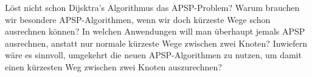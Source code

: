 \documentclass{uebung_cs}
\begin{document}

\begin{exercise}
  Löst nicht schon Dijsktra's Algorithmus das APSP-Problem?
  Warum brauchen wir besondere APSP-Algorithmen, wenn wir doch kürzeste Wege schon ausrechnen können?
  In welchen Anwendungen will man überhaupt jemals APSP ausrechnen, anstatt nur normale kürzeste Wege zwischen zwei Knoten?
  Inwiefern wäre es sinnvoll, umgekehrt die neuen APSP-Algorithmen zu nutzen, um damit einen kürzesten Weg zwischen zwei Knoten auszurechnen?
\end{exercise}
\end{document}
